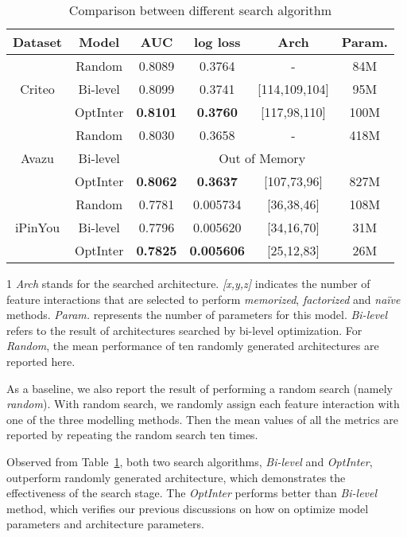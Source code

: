 \documentclass[conference]{IEEEtran}
\begin{document}
\begin{table}[!htbp]
    \renewcommand\arraystretch{1.05}
	\centering
	\caption{Comparison between different search algorithm}
	\begin{tabular}{c|c|cccc}
		\hline
		  Dataset & Model & AUC & log loss & Arch & Param. \\
		\hline
		  \multirow{3}{*}{Criteo} 
          & Random    & 0.8089 & 0.3764 & -         & 84M \\
          & Bi-level  & 0.8099 & 0.3741 & [114,109,104] & 95M \\
          & OptInter  & \textbf{0.8101} & \textbf{0.3760} & [117,98,110] & 100M  \\
		\hline
		  \multirow{3}{*}{Avazu} 
		  & Random    & 0.8030 & 0.3658 & -         & 418M \\
		  & Bi-level  & \multicolumn{4}{c}{Out of Memory} \\
		  & OptInter  & \textbf{0.8062} & \textbf{0.3637} & [107,73,96] & 827M \\
		\hline
		  \multirow{3}{*}{iPinYou}
		  & Random    & 0.7781 & 0.005734 & [36,38,46] & 108M \\
		  & Bi-level  & 0.7796 & 0.005620 & [34,16,70] & 31M \\
		  & OptInter  & \textbf{0.7825} & \textbf{0.005606} & [25,12,83] & 26M \\
		\hline
	\end{tabular}
	\begin{tablenotes}
    \footnotesize
    \item[1] \textit{Arch} stands for the searched architecture. \textit{[x,y,z]} indicates the number of feature interactions that are selected to perform \emph{memorized}, \emph{factorized} and \emph{naïve} methods. \textit{Param.} represents the number of parameters for this model. \textit{Bi-level} refers to the result of architectures searched by bi-level optimization. For \textit{Random}, the mean performance of ten randomly generated architectures are reported here.
    \end{tablenotes}
	\label{Table:different_optim}
\end{table}

As a baseline, we also report the result of performing a random search (namely \textit{random}). With random search, we randomly assign each feature interaction with one of the three modelling methods. Then the mean values of all the metrics are reported by repeating the random search ten times. 

Observed from Table~\ref{Table:different_optim}, both two search algorithms, \textit{Bi-level} and \textit{OptInter}, outperform randomly generated architecture, which demonstrates the effectiveness of the search stage. The \textit{OptInter} performs better than \textit{Bi-level} method, which verifies our previous discussions on how on optimize model parameters and architecture parameters. 
\end{document}
